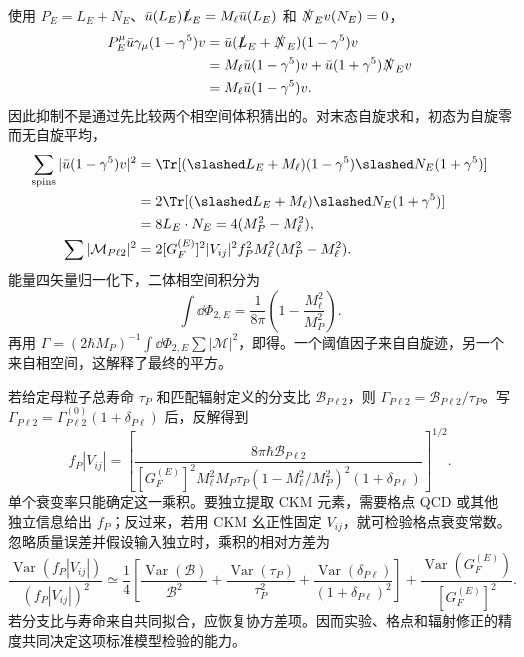 \begin{derivation}
使用 $P_E=L_E+N_E$、$\bar u(L_E)\slashed L_E=M_\ell\bar u(L_E)$ 和 $\slashed N_Ev(N_E)=0$，
\begin{align*}
 P_E^\mu\bar u\gamma_\mu(1-\gamma^5)v
 &=\bar u(\slashed L_E+\slashed N_E)(1-\gamma^5)v\\
 &=M_\ell\bar u(1-\gamma^5)v
 +\bar u(1+\gamma^5)\slashed N_Ev\\
 &=M_\ell\bar u(1-\gamma^5)v.
\end{align*}
因此抑制不是通过先比较两个相空间体积猜出的。对末态自旋求和，初态为自旋零而无自旋平均，
\begin{align*}
 \sum_{\rm spins}|\bar u(1-\gamma^5)v|^2
 &=\Tr[(\slashed L_E+M_\ell)(1-\gamma^5)
 \slashed N_E(1+\gamma^5)]\\
 &=2\Tr[(\slashed L_E+M_\ell)\slashed N_E(1+\gamma^5)]\\
 &=8L_E\cdot N_E=4(M_P^2-M_\ell^2),\\
 \sum|\mathcal M_{P\ell2}|^2
 &=2[G_F^{(E)}]^2|V_{ij}|^2f_P^2M_\ell^2(M_P^2-M_\ell^2).
\end{align*}
能量四矢量归一化下，二体相空间积分为
\begin{equation*}
 \int\dd\Phi_{2,E}=\frac{1}{8\pi}\left(1-\frac{M_\ell^2}{M_P^2}\right).
\end{equation*}
再用 $\Gamma=(2\hbar M_P)^{-1}\int\dd\Phi_{2,E}\sum|\mathcal M|^2$，即得。一个阈值因子来自自旋迹，另一个来自相空间，这解释了最终的平方。
\end{derivation}

\begin{exbox}
若给定母粒子总寿命 $\tau_P$ 和匹配辐射定义的分支比 $\mathcal B_{P\ell2}$，则 $\Gamma_{P\ell2}=\mathcal B_{P\ell2}/\tau_P$。写 $\Gamma_{P\ell2}=\Gamma_{P\ell2}^{(0)}(1+\delta_{P\ell})$ 后，反解得到
\begin{equation}
 f_P|V_{ij}|=
 \left[\frac{8\pi\hbar\mathcal B_{P\ell2}}
 {[G_F^{(E)}]^2M_\ell^2M_P\tau_P
 (1-M_\ell^2/M_P^2)^2(1+\delta_{P\ell})}\right]^{1/2}.
 \label{eq:sm-pseudoscalar-ckm-extraction}
\end{equation}
单个衰变率只能确定这一乘积。要独立提取 CKM 元素，需要格点 QCD 或其他独立信息给出 $f_P$；反过来，若用 CKM 幺正性固定 $V_{ij}$，就可检验格点衰变常数。忽略质量误差并假设输入独立时，乘积的相对方差为
\begin{equation*}
 \frac{\operatorname{Var}(f_P|V_{ij}|)}{(f_P|V_{ij}|)^2}
 \simeq\frac14\left[
 \frac{\operatorname{Var}(\mathcal B)}{\mathcal B^2}
 +\frac{\operatorname{Var}(\tau_P)}{\tau_P^2}
 +\frac{\operatorname{Var}(\delta_{P\ell})}{(1+\delta_{P\ell})^2}\right]
 +\frac{\operatorname{Var}(G_F^{(E)})}{[G_F^{(E)}]^2}.
\end{equation*}
若分支比与寿命来自共同拟合，应恢复协方差项。因而实验、格点和辐射修正的精度共同决定这项标准模型检验的能力。
\end{exbox}
